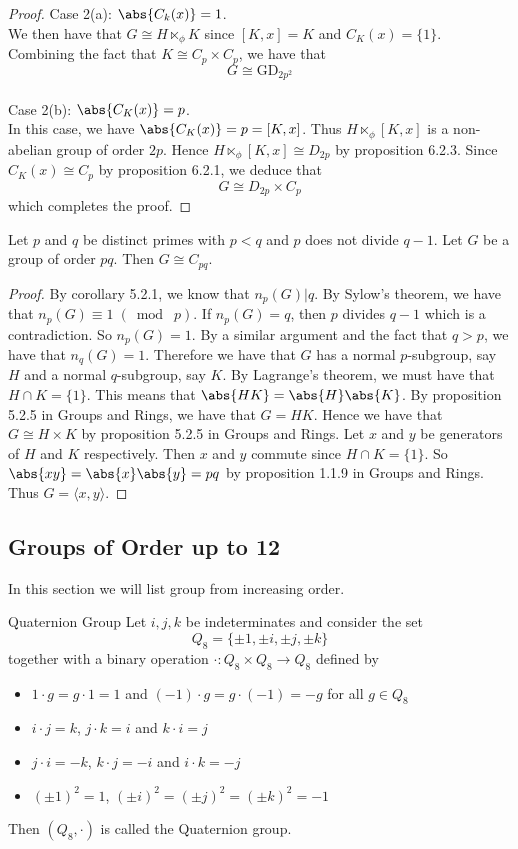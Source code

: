 \documentclass[a4paper]{article}
\begin{document}
\begin{prp}{}{}
\begin{proof}
Case 2(a): $\abs{C_k(x)}=1$. \\
We then have that $G\cong H\ltimes_\phi K$ since $[K,x]=K$ and $C_K(x)=\{1\}$. Combining the fact that $K\cong C_p\times C_p$, we have that $$G\cong\text{GD}_{2p^2}$$~\\

Case 2(b): $\abs{C_K(x)}=p$. \\
In this case, we have $\abs{C_K(x)}=p=[K,x]$. Thus $H\ltimes_\phi[K,x]$ is a non-abelian group of order $2p$. Hence $H\ltimes_\phi[K,x]\cong D_{2p}$ by proposition 6.2.3. Since $C_K(x)\cong C_p$ by proposition 6.2.1, we deduce that $$G\cong D_{2p}\times C_p$$ which completes the proof. 
\end{proof}
\end{prp}

\begin{prp}{}{} Let $p$ and $q$ be distinct primes with $p<q$ and $p$ does not divide $q-1$. Let $G$ be a group of order $pq$. Then $G\cong C_{pq}$. 
\begin{proof}
By corollary 5.2.1, we know that $n_p(G)|q$. By Sylow's theorem, we have that $n_p(G)\equiv1\;(\bmod\;p)$. If $ n_p(G)=q$, then $p$ divides $q-1$ which is a contradiction. So $n_p(G)=1$. By a similar argument and the fact that $q>p$, we have that $n_q(G)=1$. Therefore we have that $G$ has a normal $p$-subgroup, say $H$ and a normal $q$-subgroup, say $K$. By Lagrange's theorem, we must have that $H\cap K=\{1\}$. This means that $\abs{HK}=\abs{H}\abs{K}$. By proposition 5.2.5 in Groups and Rings, we have that $G=HK$. Hence we have that $G\cong H\times K$ by proposition 5.2.5 in Groups and Rings. Let $x$ and $y$ be generators of $H$ and $K$ respectively. Then $x$ and $y$ commute since $H\cap K=\{1\}$. So $\abs{xy}=\abs{x}\abs{y}=pq$ by proposition 1.1.9 in Groups and Rings. Thus $G=\langle x,y\rangle$. 
\end{proof}
\end{prp}

\subsection{Groups of Order up to 12}
In this section we will list group from increasing order. 

\begin{defn}{Quaternion Group}{} Let $i,j,k$ be indeterminates and consider the set $$Q_8=\{\pm1,\pm i,\pm j,\pm k\}$$ together with a binary operation $\cdot:Q_8\times Q_8\to Q_8$ defined by 
\begin{itemize}
\item $1\cdot g=g\cdot 1=1$ and $(-1)\cdot g=g\cdot(-1)=-g$ for all $g\in Q_8$
\item $i\cdot j=k$, $j\cdot k=i$ and $k\cdot i =j$
\item $j\cdot i=-k$, $k\cdot j=-i$ and $i\cdot k=-j$
\item $(\pm1)^2=1$, $(\pm i)^2=(\pm j)^2=(\pm k)^2=-1$
\end{itemize}
Then $(Q_8,\cdot)$ is called the Quaternion group. 
\end{defn}
\end{document}
